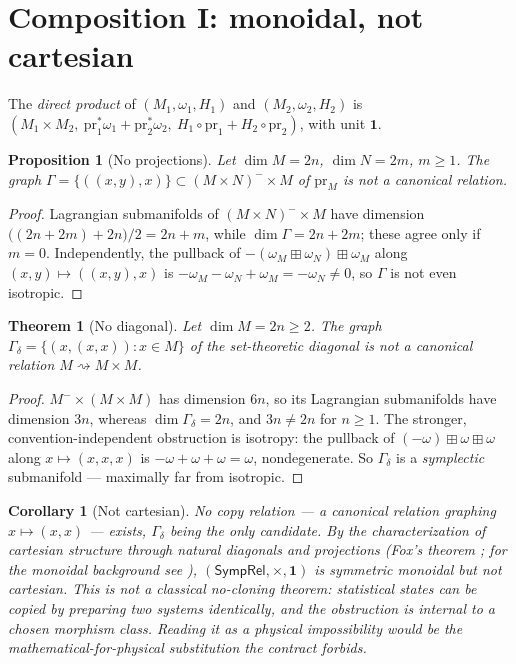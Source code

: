 \documentclass[12pt,a4paper]{article}
\theoremstyle{definition}
\theoremstyle{plain}
\newtheorem{proposition}[definition]{Proposition}
\newtheorem{theorem}[definition]{Theorem}
\newtheorem{corollary}[definition]{Corollary}
\theoremstyle{commentary}
\newcommand{\SympRel}{\mathsf{SympRel}}
\newcommand{\pt}{\mathbf{1}}
\newcommand{\prm}{\mathrm{pr}}
\begin{document}
\section{Composition I: monoidal, not cartesian}

The \emph{direct product} of $(M_1,\omega_1,H_1)$ and $(M_2,\omega_2,H_2)$ is
$(M_1\times M_2,\ \prm_1^{*}\omega_1+\prm_2^{*}\omega_2,\ H_1\circ\prm_1+H_2\circ\prm_2)$,
with unit $\pt$.

\begin{proposition}[No projections]\label{prop:noproj}
Let $\dim M=2n$, $\dim N=2m$, $m\ge1$. The graph $\Gamma=\{((x,y),x)\}\subset
(M\times N)^{-}\times M$ of $\prm_M$ is \emph{not} a canonical relation.
\end{proposition}

\begin{proof}
Lagrangian submanifolds of $(M\times N)^{-}\times M$ have dimension
$\bigl((2n+2m)+2n\bigr)/2=2n+m$, while $\dim\Gamma=2n+2m$; these agree only if $m=0$.
Independently, the pullback of $-(\omega_M\boxplus\omega_N)\boxplus\omega_M$ along
$(x,y)\mapsto((x,y),x)$ is $-\omega_M-\omega_N+\omega_M=-\omega_N\neq0$, so $\Gamma$ is not
even isotropic.
\end{proof}

\begin{theorem}[No diagonal]\label{thm:nodiag}
Let $\dim M=2n\ge2$. The graph $\Gamma_\delta=\{(x,(x,x)):x\in M\}$ of the set-theoretic
diagonal is not a canonical relation $M\rightsquigarrow M\times M$.
\end{theorem}

\begin{proof}
$M^{-}\times(M\times M)$ has dimension $6n$, so its Lagrangian submanifolds have dimension
$3n$, whereas $\dim\Gamma_\delta=2n$, and $3n\ne2n$ for $n\ge1$. The stronger,
convention-independent obstruction is isotropy: the pullback of
$(-\omega)\boxplus\omega\boxplus\omega$ along $x\mapsto(x,x,x)$ is
$-\omega+\omega+\omega=\omega$, nondegenerate. So $\Gamma_\delta$ is a \emph{symplectic}
submanifold --- maximally far from isotropic.
\end{proof}

\begin{corollary}[Not cartesian]\label{cor:noncart}
No \emph{copy relation} --- a canonical relation graphing $x\mapsto(x,x)$ --- exists,
$\Gamma_\delta$ being the only candidate. By the characterization of cartesian structure
through natural diagonals and projections (Fox's theorem \cite{Fox1976}; for the monoidal
background see \cite{MacLane1998}),
$(\SympRel,\times,\pt)$ is symmetric monoidal but not cartesian. This is \emph{not} a
classical no-cloning theorem: statistical states can be copied by preparing two systems
identically, and the obstruction is internal to a chosen morphism class. Reading it as a
physical impossibility would be the mathematical-for-physical substitution the contract
forbids.
\end{corollary}
\end{document}
